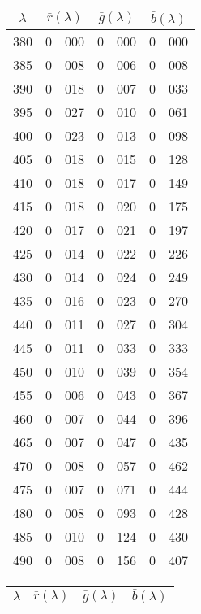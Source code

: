 {
\small
{
\centering


\begin{minipage}{.3\textwidth}
\begin{tabular}{c|r@{.}l | r@{.}l | r@{.}l}
$\lambda$ & \multicolumn{2}{c|}{$\bar r(\lambda)$} &  \multicolumn{2}{c|}{$\bar g(\lambda)$} &  \multicolumn{2}{c}{$\bar b(\lambda)$} \\
\hline
 380 &   0&000 &   0&000 &   0&000 \\
 385 &   0&008 &   0&006 &   0&008 \\
 390 &   0&018 &   0&007 &   0&033 \\
 395 &   0&027 &   0&010 &   0&061 \\
 400 &   0&023 &   0&013 &   0&098 \\
 405 &   0&018 &   0&015 &   0&128 \\
 410 &   0&018 &   0&017 &   0&149 \\
 415 &   0&018 &   0&020 &   0&175 \\
 420 &   0&017 &   0&021 &   0&197 \\
 425 &   0&014 &   0&022 &   0&226 \\
 430 &   0&014 &   0&024 &   0&249 \\
 435 &   0&016 &   0&023 &   0&270 \\
 440 &   0&011 &   0&027 &   0&304 \\
 445 &   0&011 &   0&033 &   0&333 \\
 450 &   0&010 &   0&039 &   0&354 \\
 455 &   0&006 &   0&043 &   0&367 \\
 460 &   0&007 &   0&044 &   0&396 \\
 465 &   0&007 &   0&047 &   0&435 \\
 470 &   0&008 &   0&057 &   0&462 \\
 475 &   0&007 &   0&071 &   0&444 \\
 480 &   0&008 &   0&093 &   0&428 \\
 485 &   0&010 &   0&124 &   0&430 \\
 490 &   0&008 &   0&156 &   0&407 \\
\end{tabular}
\end{minipage}\hskip3mm
\begin{minipage}{.3\textwidth}
\begin{tabular}{c|r@{.}l | r@{.}l | r@{.}l}
$\lambda$ & \multicolumn{2}{c|}{$\bar r(\lambda)$} &  \multicolumn{2}{c|}{$\bar g(\lambda)$} &  \multicolumn{2}{c}{$\bar b(\lambda)$} \\

\end{tabular}
\end{minipage}}}
